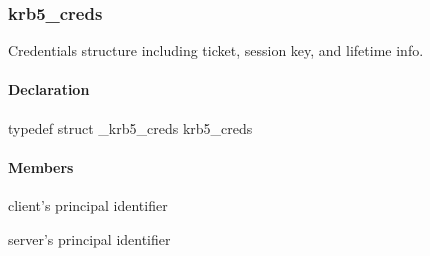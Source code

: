 \documentclass[letterpaper,10pt,english]{sphinxmanual}
\begin{document}
\subsubsection{krb5\_creds}
\label{appdev/refs/types/krb5_creds::doc}\label{appdev/refs/types/krb5_creds:krb5-creds}\label{appdev/refs/types/krb5_creds:krb5-creds-struct}

\begin{fulllineitems}
\label{appdev/refs/types/krb5_creds:c.krb5_creds}
\end{fulllineitems}


Credentials structure including ticket, session key, and lifetime info.


\paragraph{Declaration}
\label{appdev/refs/types/krb5_creds:declaration}
typedef struct \_krb5\_creds  krb5\_creds


\paragraph{Members}
\label{appdev/refs/types/krb5_creds:members}

\begin{fulllineitems}
\label{appdev/refs/types/krb5_creds:c.krb5_creds.magic}
\end{fulllineitems}


\begin{fulllineitems}
\label{appdev/refs/types/krb5_creds:c.krb5_creds.client}
client's principal identifier

\end{fulllineitems}


\begin{fulllineitems}
\label{appdev/refs/types/krb5_creds:c.krb5_creds.server}
server's principal identifier

\end{fulllineitems}
\end{document}
